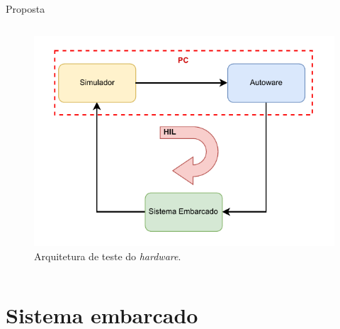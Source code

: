 \documentclass{if-beamer}
\begin{document}
\begin{frame}{Proposta}
\begin{columns}
\begin{column}{0.5\textwidth}
				\begin{figure}[H]
				\centering
				\includegraphics[width=\linewidth]{img/architecture_HIL}
				\caption{Arquitetura de teste do \textit{hardware}.}
				\label{fig:architecture_HIL}
			\end{figure}
			
		\end{column}
		
	\end{columns}
	
\end{frame}

\section{Sistema embarcado}
\end{document}
